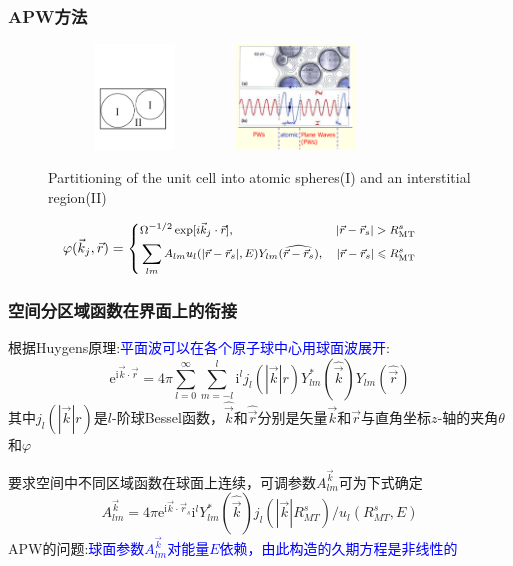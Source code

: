 \documentclass[cjk,slidestop,compress,mathserif,blue]{beamer}
\begin{document}
\frame
{
\frametitle{\textrm{APW}方法}
\begin{figure}[h!]
\centering
\includegraphics[height=1.10in,width=1.80in,viewport=40 150 545 465,clip]{Figures/Muffin_tin.pdf}
\includegraphics[height=1.10in,width=1.45in,viewport=1 20 485 435,clip]{Figures/APW.png}
\caption{\tiny \textrm{Partitioning of the unit cell into atomic spheres(I) and an interstitial region(II)}}%
\label{Muffin_tin-2}
\end{figure}
\begin{displaymath}
\hskip -28pt\footnotesize \varphi(\vec k_j,\vec r)=\left\{
  \begin{aligned}
    &\Omega^{-1/2}\exp[i\vec k_j\cdot\vec r],&|\vec r-\vec r_s|>R_{\mathrm{MT}}^s\\
    &\sum_{lm}A_{lm}u_l(|\vec r-\vec r_s|,E)Y_{lm}(\widehat{\vec r-\vec r_s}),&|\vec r-\vec r_s|\leqslant R_{\mathrm{MT}}^s
  \end{aligned}
\right.
\end{displaymath}
}

\frame
{
	\frametitle{空间分区域函数在界面上的衔接}
	根据\textrm{Huygens}原理:\textcolor{blue}{平面波可以在各个原子球中心用球面波展开}:
	\begin{displaymath}
		\mathrm{e}^{\mathrm{i}\vec k\cdot\vec r}=4\pi\sum_{l=0}^{\infty}\sum_{m=-l}^l\mathrm{i}^lj_l(|\vec k|r)Y_{lm}^{\ast}(\hat{\vec k})Y_{lm}(\hat{\vec r})
	\end{displaymath}
	其中$j_l(|\vec k|r)$是$l$-阶球\textrm{Bessel}函数，$\hat{\vec k}$和$\hat{\vec r}$分别是矢量$\vec k$和$\vec r$与直角坐标$z$-轴的夹角$\theta$和$\varphi$

	要求空间中不同区域函数在球面上连续，可调参数$A_{lm}^{\vec k}$可为下式确定
\begin{displaymath}
	A_{lm}^{\vec k}=4\pi\mathrm{e}^{\mathrm{i}\vec k\cdot\vec r_s}\mathrm{i}^lY_{lm}^{\ast}(\hat{\vec k})j_l(|\vec k|R_{MT}^s)/u_l(R_{MT}^s,E)
\end{displaymath}
\textrm{APW}的问题:\textcolor{blue}{球面参数$A_{lm}^{\vec k}$对能量$E$依赖，由此构造的久期方程是非线性的}
}
\end{document}
